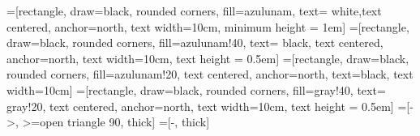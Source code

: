 
	=[rectangle, draw=black, rounded corners, fill=azulunam, text= white,text centered, anchor=north, text width=10cm, minimum height = 1em]
    =[rectangle, draw=black, rounded corners, fill=azulunam!40, text= black, text centered, anchor=north, text width=10cm, text height = 0.5em]
    =[rectangle, draw=black, rounded corners,  fill=azulunam!20,
        text centered, anchor=north, text=black, text width=10cm]
    =[rectangle, draw=black, rounded corners, fill=gray!40, text= gray!20, text centered, anchor=north, text width=10cm, text height = 0.5em]
    =[->, >=open triangle 90, thick]
    =[-, thick]

